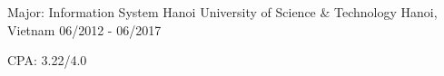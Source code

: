 

\begin{cventries}

  \cventry
    {Major: Information System} %
    {Hanoi University of Science \& Technology} %
    {Hanoi, Vietnam} %
    {06/2012 - 06/2017} %
    {
      \begin{cvitems} %
        \item {CPA: 3.22/4.0}
      \end{cvitems}
    }

\end{cventries}
